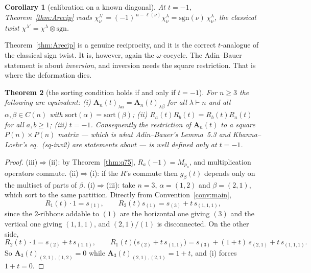 \documentclass[11pt]{article}
\newtheorem{theorem}{Theorem}[section]
\newtheorem{corollary}[theorem]{Corollary}
\theoremstyle{definition}
\theoremstyle{remark}
\newcommand{\Mult}[1]{M_{#1}}
\newcommand{\Amat}{\mathbf{A}}
\begin{document}
\begin{corollary}[calibration on a known diagonal]\label{cor:calib}
At $t=-1$, Theorem~\ref{thm:Arecip} reads
$\chi^{\lambda'}_{\nu}=(-1)^{\,n-\ell(\nu)}\chi^{\lambda}_{\nu}=\mathrm{sgn}(\nu)\,\chi^\lambda_\nu$,
the classical twist $\chi^{\lambda'}=\chi^{\lambda}\otimes\mathrm{sgn}$.
\end{corollary}

Theorem~\ref{thm:Arecip} is a genuine reciprocity, and it is the correct $t$-analogue of the
classical sign twist.  It is, however, again the $\omega$-cocycle.  The Adin--Bauer statement
is about \emph{inversion}, and inversion needs the square restriction.  That is where the
deformation dies.

\begin{theorem}[the sorting condition holds if and only if $t=-1$]\label{thm:sort}
For $n\ge3$ the following are equivalent:
\emph{(i)} $\Amat_n(t)_{\lambda\alpha}=\Amat_n(t)_{\lambda\beta}$ for all $\lambda\vdash n$
and all $\alpha,\beta\in C(n)$ with $\mathrm{sort}(\alpha)=\mathrm{sort}(\beta)$;
\emph{(ii)} $R_a(t)R_b(t)=R_b(t)R_a(t)$ for all $a,b\ge1$;
\emph{(iii)} $t=-1$.
Consequently the restriction of $\Amat_n(t)$ to a square $P(n)\times P(n)$ matrix --- which
is what Adin--Bauer's Lemma~5.3 and Khanna--Loehr's eq.~\emph{(sq-inv2)} are statements about
--- is well defined only at $t=-1$.
\end{theorem}

\begin{proof}
(iii)$\Rightarrow$(ii): by Theorem~\ref{thm:q75}, $R_a(-1)=\Mult{p_a}$, and multiplication
operators commute.  (ii)$\Rightarrow$(i): if the $R$'s commute then $g_\beta(t)$ depends only
on the multiset of parts of $\beta$.  (i)$\Rightarrow$(iii): take $n=3$, $\alpha=(1,2)$ and
$\beta=(2,1)$, which sort to the same partition.  Directly from Convention~\ref{conv:main},
\[
  R_1(t)\cdot1=s_{(1)},\qquad R_2(t)s_{(1)}=s_{(3)}+t\,s_{(1,1,1)},
\]
since the $2$-ribbons addable to $(1)$ are the horizontal one giving $(3)$ and the vertical
one giving $(1,1,1)$, and $(2,1)/(1)$ is disconnected.  On the other side,
\[
  R_2(t)\cdot1=s_{(2)}+t\,s_{(1,1)},\qquad
  R_1(t)\bigl(s_{(2)}+t\,s_{(1,1)}\bigr)=s_{(3)}+(1+t)\,s_{(2,1)}+t\,s_{(1,1,1)} .
\]
So $\Amat_3(t)_{(2,1),(1,2)}=0$ while $\Amat_3(t)_{(2,1),(2,1)}=1+t$, and (i) forces
$1+t=0$.
\end{proof}
\end{document}

